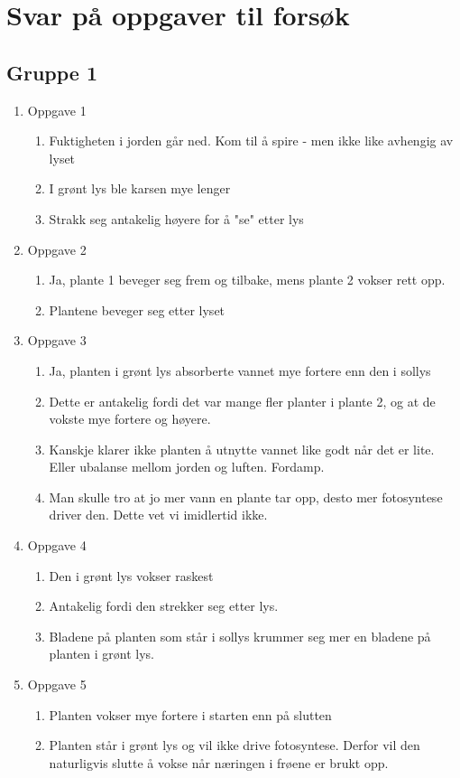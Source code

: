 \chapter{Svar på oppgaver til forsøk}
\label{svaroppgaver}
\section{Gruppe 1}

\begin{enumerate}
	\item Oppgave 1
	\begin{enumerate}
		\item Fuktigheten i jorden går ned. Kom til å spire - men ikke like avhengig av lyset
		\item I grønt lys ble karsen mye lenger
		\item Strakk seg antakelig høyere for å "se" etter lys
	\end{enumerate}

	\item Oppgave 2
	\begin{enumerate}
		\item Ja, plante 1 beveger seg frem og tilbake, mens plante 2 vokser rett opp.
		\item Plantene beveger seg etter lyset
	\end{enumerate}	

	\item Oppgave 3
	\begin{enumerate}
		\item Ja, planten i grønt lys absorberte vannet mye fortere enn den i sollys
		\item Dette er antakelig fordi det var mange fler planter i plante 2, og at de vokste mye fortere og høyere. 
		\item Kanskje klarer ikke planten å utnytte vannet like godt når det er lite. Eller ubalanse mellom jorden og luften. Fordamp.
		\item Man skulle tro at jo mer vann en plante tar opp, desto mer fotosyntese driver den. Dette vet vi imidlertid ikke.
	\end{enumerate}

	\item Oppgave 4
	\begin{enumerate}
		\item Den i grønt lys vokser raskest
		\item Antakelig fordi den strekker seg etter lys. 
		\item Bladene på planten som står i sollys krummer seg mer en bladene på planten i grønt lys. 
	\end{enumerate}

	\item Oppgave 5
	\begin{enumerate}
		\item Planten vokser mye fortere i starten enn på slutten
		\item Planten står i grønt lys og vil ikke drive fotosyntese. Derfor vil den naturligvis slutte å vokse når næringen i frøene er brukt opp. 
	\end{enumerate}
\end{enumerate}


